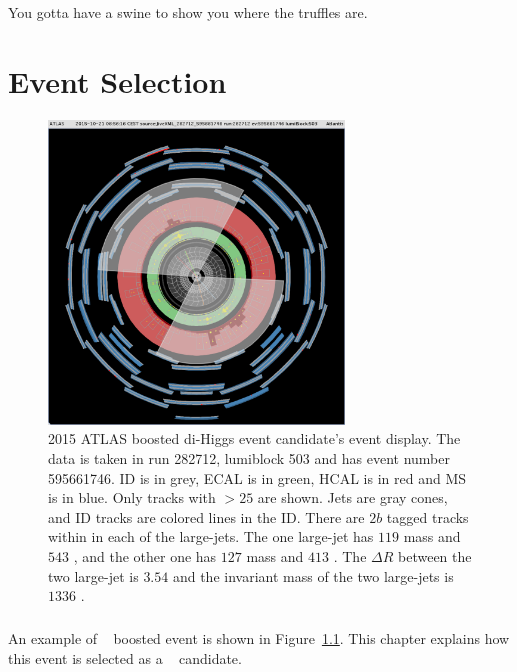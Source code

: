 \begin{savequote}[75mm]
You gotta have a swine to show you where the truffles are.
\end{savequote}

\chapter{Event Selection}
\label{sec:selection}

\begin{figure}[h!]
  \centering
  \includegraphics[width=0.7\textwidth]{figures/theory/JiveXML_282712_595661746-YX-2018-04-16-20-50-34}
  \caption{2015 ATLAS boosted di-Higgs event candidate's event display. The data is taken in run 282712, lumiblock 503 and has event number 595661746. ID is in grey, ECAL is in green, HCAL is in red and MS is in blue. Only tracks with \pt $>25$ \GeV are shown. Jets are gray cones, and ID tracks are colored lines in the ID. There are $2b$ tagged tracks within in each of the large-\R jets. The one large-\R jet has $119$ \GeV mass and $543$ \GeV \pt, and the other one has $127$ \GeV mass and $413$ \GeV \pt. The $\Delta R$ between the two large-\R jet is $3.54$ and the invariant mass of the two large-\R jets is $1336$ \GeV. }
  \label{fig:event_display}
\end{figure}

\paragraph{}
An example of \Xtohhb~ boosted event is shown in Figure~\ref{fig:event_display}. This chapter explains how this event is selected as a \Xtohhb~ candidate.

